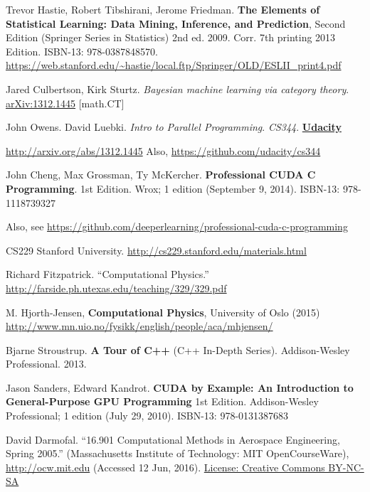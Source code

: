 \documentclass[10pt]{amsart}
\begin{document}
\begin{thebibliography}{9}
Trevor Hastie, Robert Tibshirani, Jerome Friedman.   \textbf{The Elements of Statistical Learning: Data Mining, Inference, and Prediction}, Second Edition (Springer Series in Statistics) 2nd ed. 2009. Corr. 7th printing 2013 Edition.  ISBN-13: 978-0387848570.  \url{https://web.stanford.edu/~hastie/local.ftp/Springer/OLD/ESLII_print4.pdf}

Jared Culbertson, Kirk Sturtz.  \emph{Bayesian machine learning via category theory}.  \href{http://arxiv.org/abs/1312.1445}{arXiv:1312.1445} [math.CT]

John Owens.  David Luebki.  \emph{Intro to Parallel Programming}.  \emph{CS344}.  \textbf{\href{https://www.udacity.com/}{Udacity}}  
  
\url{http://arxiv.org/abs/1312.1445} Also, \url{https://github.com/udacity/cs344}  

John Cheng, Max Grossman, Ty McKercher.  \textbf{Professional CUDA C Programming}.  1st Edition.  Wrox; 1 edition (September 9, 2014).  ISBN-13: 978-1118739327

Also, see \url{https://github.com/deeperlearning/professional-cuda-c-programming}

CS229 Stanford University.  \url{http://cs229.stanford.edu/materials.html}


Richard Fitzpatrick.  ``Computational Physics.''  \url{http://farside.ph.utexas.edu/teaching/329/329.pdf}

 M. Hjorth-Jensen, \textbf{Computational Physics}, University of Oslo (2015) \url{http://www.mn.uio.no/fysikk/english/people/aca/mhjensen/}

 Bjarne Stroustrup.  \textbf{A Tour of C++} (C++ In-Depth Series). Addison-Wesley Professional.   2013. 
 
Jason Sanders, Edward Kandrot.  \textbf{CUDA by Example: An Introduction to General-Purpose GPU Programming} 1st Edition.  Addison-Wesley Professional; 1 edition (July 29, 2010).  ISBN-13: 978-0131387683

  David Darmofal. ``16.901 Computational Methods in Aerospace Engineering, Spring 2005.'' (Massachusetts Institute of Technology: MIT OpenCourseWare), \url{http://ocw.mit.edu} (Accessed 12 Jun, 2016). \href{http://creativecommons.org/licenses/by-nc-sa/4.0/}{License: Creative Commons BY-NC-SA}


\end{thebibliography}
\end{document}
